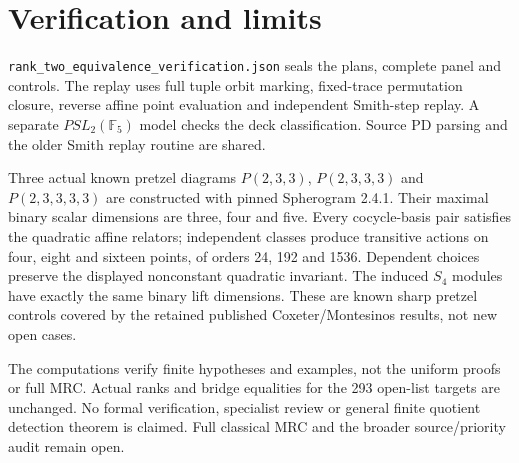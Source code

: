 \documentclass[11pt]{article}
\newcommand{\F}{\mathbb F}
\begin{document}
\section{Verification and limits}

\texttt{rank\_two\_equivalence\_verification.json} seals the
plans, complete panel and controls. The replay uses full tuple
orbit marking, fixed-trace permutation closure, reverse affine
point evaluation and independent Smith-step replay. A separate
$PSL_2(\F_5)$ model checks the deck classification. Source PD
parsing and the older Smith replay routine are shared.

Three actual known pretzel diagrams $P(2,3,3)$,
$P(2,3,3,3)$ and $P(2,3,3,3,3)$ are constructed with pinned
Spherogram 2.4.1. Their maximal binary scalar dimensions are
three, four and five. Every cocycle-basis pair satisfies the
quadratic affine relators; independent classes produce
transitive actions on four, eight and sixteen points, of
orders 24, 192 and 1536. Dependent choices preserve the
displayed nonconstant quadratic invariant. The induced $S_4$
modules have exactly the same binary lift dimensions. These
are known sharp pretzel controls covered by the retained
published Coxeter/Montesinos results, not new open cases.

The computations verify finite hypotheses and examples, not
the uniform proofs or full MRC. Actual ranks and bridge
equalities for the 293 open-list targets are unchanged.
No formal verification, specialist review or general finite
quotient detection theorem is claimed. Full classical MRC and
the broader source/priority audit remain open.
\end{document}

